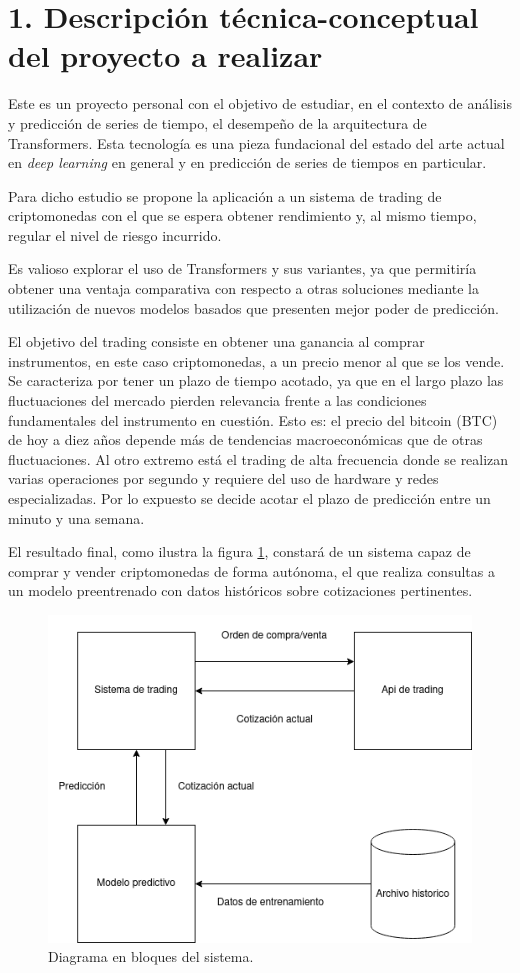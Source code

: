 \documentclass[
    11pt, %
]{charter}
\begin{document}
    \section{1. Descripción técnica-conceptual del proyecto a realizar}
    \label{sec:descripcion}
    Este es un proyecto personal con el objetivo de estudiar, en el contexto de análisis y predicción de series de tiempo,
    el desempeño de la arquitectura de Transformers. Esta tecnología es una pieza fundacional del estado del arte actual
    en \textit{deep learning} en general y en predicción de series de tiempos en particular.

    Para dicho estudio se propone la aplicación a un sistema de trading de criptomonedas con el que se espera obtener
    rendimiento y, al mismo tiempo, regular el nivel de riesgo incurrido.

    Es valioso explorar el uso de Transformers y sus variantes, ya que permitiría obtener una ventaja comparativa con
    respecto a otras soluciones mediante la utilización de nuevos modelos basados que presenten mejor poder de predicción.

    El objetivo del trading consiste en obtener una ganancia al comprar instrumentos, en este caso criptomonedas, a un precio menor al que se los vende.
    Se caracteriza por tener un plazo de tiempo acotado, ya que en el largo plazo las fluctuaciones del mercado pierden relevancia
    frente a las condiciones fundamentales del instrumento en cuestión.
    Esto es: el precio del bitcoin (BTC) de hoy a diez años depende más de tendencias macroeconómicas que de otras fluctuaciones.
    Al otro extremo está el trading de alta frecuencia donde se realizan varias operaciones por segundo y requiere del uso de hardware y redes especializadas.
    Por lo expuesto se decide acotar el plazo de predicción entre un minuto y una semana.

    El resultado final, como ilustra la figura \ref{fig:diagBloques}, constará de un sistema capaz de comprar y vender criptomonedas de forma autónoma, el que realiza consultas a un modelo preentrenado con datos históricos sobre cotizaciones pertinentes.


    \begin{figure}[htpb]
            \centering
            \includegraphics[width=.65\textwidth]{./Figuras/bloques-tp-final.drawio.png}
            \caption{Diagrama en bloques del sistema.}
            \label{fig:diagBloques}
        \end{figure}
\end{document}
